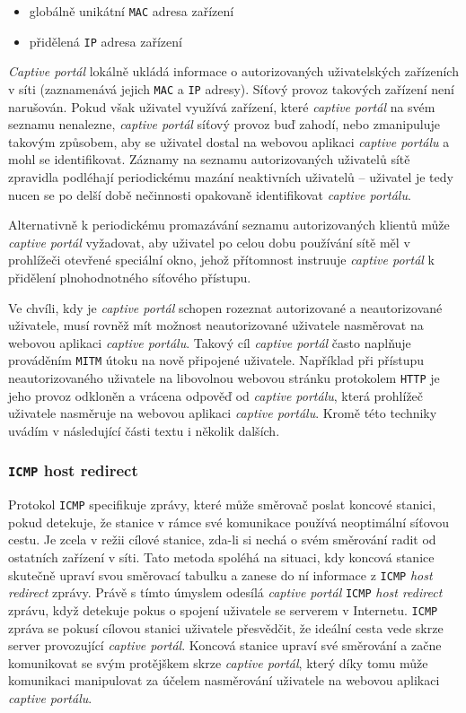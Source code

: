 \documentclass[thesis=M,czech]{FITthesis}[2012/10/20]
\begin{document}
\begin{itemize}
 \item globálně unikátní \texttt{MAC} adresa zařízení
 \item přidělená \texttt{IP} adresa zařízení
\end{itemize}

\textit{Captive portál} lokálně ukládá informace o autorizovaných uživatelských zařízeních v síti (zaznamenává jejich \texttt{MAC} a \texttt{IP} adresy). Síťový provoz takových zařízení není narušován. Pokud však uživatel využívá zařízení, které \textit{captive portál} na svém seznamu nenalezne, \textit{captive portál} síťový provoz buď zahodí, nebo zmanipuluje takovým způsobem, aby se uživatel dostal na webovou aplikaci \textit{captive portálu} a mohl se identifikovat. Záznamy na seznamu autorizovaných uživatelů sítě zpravidla podléhají periodickému mazání neaktivních uživatelů -- uživatel je tedy nucen se po delší době nečinnosti opakovaně identifikovat \textit{captive portálu}.

Alternativně k periodickému promazávání seznamu autorizovaných klientů může \textit{captive portál} vyžadovat, aby uživatel po celou dobu používání sítě měl v prohlížeči otevřené speciální okno, jehož přítomnost instruuje \textit{captive portál} k přidělení plnohodnotného síťového přístupu.

Ve chvíli, kdy je \textit{captive portál} schopen rozeznat autorizované a neautorizované uživatele, musí rovněž mít možnost neautorizované uživatele nasměrovat na webovou aplikaci \textit{captive portálu}. Takový cíl \textit{captive portál} často naplňuje prováděním \texttt{MITM} útoku na nově připojené uživatele. Například při přístupu neautorizovaného uživatele na libovolnou webovou stránku protokolem \texttt{HTTP} je jeho provoz odkloněn a vrácena odpověď od \textit{captive portálu}, která prohlížeč uživatele nasměruje na webovou aplikaci \textit{captive portálu}. Kromě této techniky uvádím v následující části textu i několik dalších.

\subsubsection{\texttt{ICMP} host redirect}

Protokol \texttt{ICMP} specifikuje zprávy, které může směrovač poslat koncové stanici, pokud detekuje, že stanice v rámce své komunikace používá neoptimální síťovou cestu. Je zcela v režii cílové stanice, zda-li si nechá o svém směrování radit od ostatních zařízení v síti. Tato metoda spoléhá na situaci, kdy koncová stanice skutečně upraví svou směrovací tabulku a zanese do ní informace z \texttt{ICMP} \textit{host redirect} zprávy. Právě s tímto úmyslem odesílá \textit{captive portál} \texttt{ICMP} \textit{host redirect} zprávu, když detekuje pokus o spojení uživatele se serverem v Internetu. \texttt{ICMP} zpráva se pokusí cílovou stanici uživatele přesvědčit, že ideální cesta vede skrze server provozující \textit{captive portál}. Koncová stanice upraví své směrování a začne komunikovat se svým protějškem skrze \textit{captive portál}, který díky tomu může komunikaci manipulovat za účelem nasměrování uživatele na webovou aplikaci \textit{captive portálu}.
\end{document}
